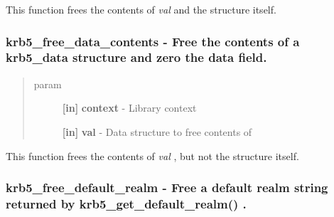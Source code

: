 \documentclass[letterpaper,10pt,english]{sphinxmanual}
\begin{document}
This function frees the contents of \emph{val} and the structure itself.


\subsubsection{krb5\_free\_data\_contents -  Free the contents of a krb5\_data structure and zero the data field.}
\label{appdev/refs/api/krb5_free_data_contents:krb5-free-data-contents-free-the-contents-of-a-krb5-data-structure-and-zero-the-data-field}\label{appdev/refs/api/krb5_free_data_contents::doc}

\begin{fulllineitems}
\label{appdev/refs/api/krb5_free_data_contents:c.krb5_free_data_contents}
\end{fulllineitems}

\begin{quote}\begin{description}
\item[{param}] \leavevmode
\textbf{{[}in{]}} \textbf{context} - Library context

\textbf{{[}in{]}} \textbf{val} - Data structure to free contents of

\end{description}\end{quote}

This function frees the contents of \emph{val} , but not the structure itself.


\subsubsection{krb5\_free\_default\_realm -  Free a default realm string returned by krb5\_get\_default\_realm() .}
\label{appdev/refs/api/krb5_free_default_realm:krb5-free-default-realm-free-a-default-realm-string-returned-by-krb5-get-default-realm}\label{appdev/refs/api/krb5_free_default_realm::doc}

\begin{fulllineitems}
\label{appdev/refs/api/krb5_free_default_realm:c.krb5_free_default_realm}
\end{fulllineitems}
\end{document}
